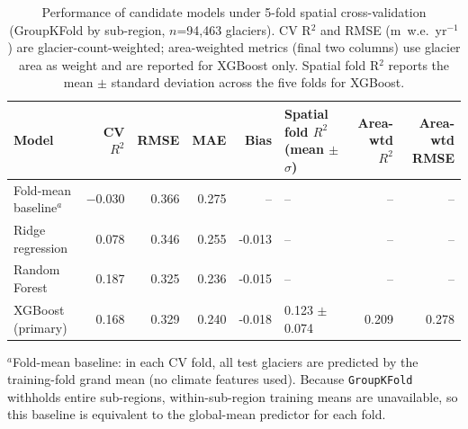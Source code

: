 \begin{table}[htbp]
\centering
\caption{Performance of candidate models under 5-fold spatial cross-validation (GroupKFold by sub-region, $n$=94,463 glaciers). CV R$^2$ and RMSE (m~w.e.~yr$^{-1}$) are glacier-count-weighted; area-weighted metrics (final two columns) use glacier area as weight and are reported for XGBoost only. Spatial fold R$^2$ reports the mean $\pm$ standard deviation across the five folds for XGBoost.}
\label{tab:model_comparison}
\begin{tabular}{lrrrrlrr}
\hline
Model & CV $R^2$ & RMSE & MAE & Bias & Spatial fold $R^2$ (mean $\pm$ $\sigma$) & Area-wtd $R^2$ & Area-wtd RMSE \\
\hline
Fold-mean baseline$^{a}$ & $-0.030$ & 0.366 & 0.275 & -- & -- & -- & -- \\
Ridge regression & 0.078 & 0.346 & 0.255 & -0.013 & -- & -- & -- \\
Random Forest & 0.187 & 0.325 & 0.236 & -0.015 & -- & -- & -- \\
XGBoost (primary) & 0.168 & 0.329 & 0.240 & -0.018 & 0.123 $\pm$ 0.074 & 0.209 & 0.278 \\
\hline
\end{tabular}
\begin{flushleft}
\small $^{a}$Fold-mean baseline: in each CV fold, all test glaciers are predicted by the
training-fold grand mean (no climate features used).  Because \texttt{GroupKFold} withholds
entire sub-regions, within-sub-region training means are unavailable, so this baseline is
equivalent to the global-mean predictor for each fold.
\end{flushleft}
\end{table}